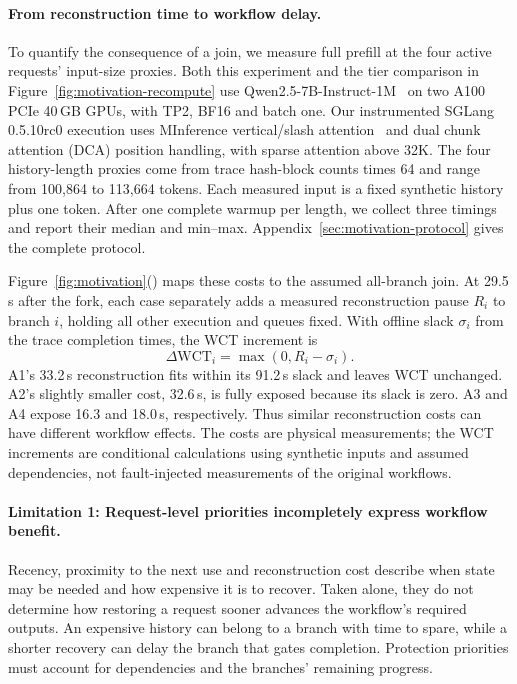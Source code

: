 \paragraph{From reconstruction time to workflow delay.}
To quantify the consequence of a join, we measure full prefill at the
four active requests' input-size proxies. Both this experiment and the
tier comparison in Figure~\ref{fig:motivation-recompute}
use Qwen2.5-7B-Instruct-1M~\cite{qwen2025qwen25oneM} on two A100 PCIe
40\,GB GPUs, with TP2, BF16 and batch one. Our instrumented SGLang
0.5.10rc0 execution uses MInference vertical/slash
attention~\cite{jiang2024minference} and dual chunk attention (DCA)
position handling, with sparse attention above 32K.
The four history-length proxies come from trace hash-block counts times
64 and range from 100,864 to 113,664 tokens. Each measured input is a
fixed synthetic history plus one token. After one complete warmup per
length, we collect three timings and report their median and min--max.
Appendix~\ref{sec:motivation-protocol} gives the complete protocol.

Figure~\ref{fig:motivation}() maps these costs to the
assumed all-branch join. At 29.5\,s after the fork, each case separately
adds a measured reconstruction pause $R_i$ to branch $i$, holding all
other execution and queues fixed. With offline slack $\sigma_i$ from
the trace completion times, the WCT increment is
\[
  \Delta\mathrm{WCT}_i=\max(0,R_i-\sigma_i).
\]
A1's 33.2\,s reconstruction fits within its 91.2\,s slack and leaves WCT
unchanged. A2's slightly smaller cost, 32.6\,s, is fully exposed because
its slack is zero. A3 and A4 expose 16.3 and 18.0\,s, respectively.
Thus similar reconstruction costs can have different workflow effects.
The costs are physical measurements; the WCT increments are conditional
calculations using synthetic inputs and assumed dependencies, not
fault-injected measurements of the original workflows.

\paragraph{Limitation 1: Request-level priorities incompletely express
workflow benefit.}
Recency, proximity to the next use and reconstruction cost describe when
state may be needed and how expensive it is to recover. Taken alone,
they do not determine how restoring a request sooner advances the
workflow's required outputs. An expensive history can belong to a branch
with time to spare, while a shorter recovery can delay the branch that
gates completion. Protection priorities must account for dependencies
and the branches' remaining progress.

